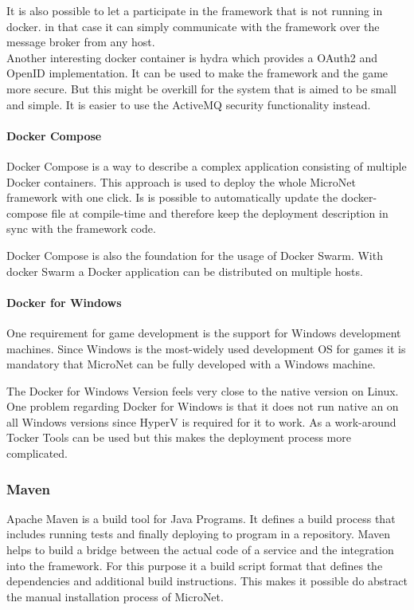 It is also possible to let a \ms{} participate in the framework that is not
running in docker. in that case it can simply communicate with the framework
over the message broker from any host.\\

Another interesting docker container is hydra which provides a OAuth2 and
OpenID implementation. It can be used to make the framework and the game more
secure. But this might be overkill for the system that is aimed to be small and
simple. It is easier to use the ActiveMQ security functionality instead.\\

\paragraph{Docker Compose}

Docker Compose is a way to describe a complex application consisting of multiple
Docker containers. This approach is used to deploy the whole MicroNet framework
with one click. Is is possible to automatically update the docker-compose file
at compile-time and therefore keep the deployment description in sync with the
framework code.

Docker Compose is also the foundation for the usage of Docker Swarm. With docker
Swarm a Docker application can be distributed on multiple hosts. 

\paragraph{Docker for Windows}

One requirement for game development is the support for Windows development
machines. Since Windows is the most-widely used development OS for games it is
mandatory that MicroNet can be fully developed with a Windows machine. 

The Docker for Windows Version feels very close to the native version on Linux.
One problem regarding Docker for Windows is that it does not run native an on
all Windows versions since HyperV is required for it to work. As a work-around
Tocker Tools can be used but this makes the deployment process more complicated.

\subsubsection{Maven}

Apache Maven is a build tool for Java Programs. It defines a build process that
includes running tests and finally deploying to program in a repository. Maven
helps to build a bridge between the actual code of a service and the integration
into the framework. For this purpose it a build script format that defines the
dependencies and additional build instructions. This makes it possible do
abstract the manual installation process of MicroNet. 

